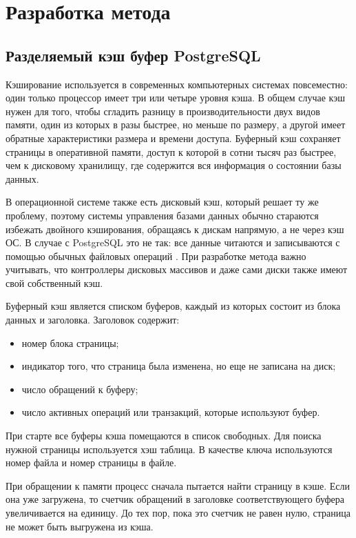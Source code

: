 \chapter{Разработка метода}

\section{Разделяемый кэш буфер PostgreSQL}

Кэширование используется в современных компьютерных системах повсеместно: один только процессор имеет три или четыре уровня кэша.
В общем случае кэш нужен для того, чтобы сгладить разницу в производительности двух видов памяти, один из которых в разы быстрее, но меньше по размеру, а другой имеет обратные характеристики размера и времени доступа.
Буферный кэш сохраняет страницы в оперативной памяти, доступ к которой в сотни тысяч раз быстрее, чем к дисковому хранилищу, где содержится вся информация о состоянии базы данных.

В операционной системе также есть дисковый кэш, который решает ту же проблему, поэтому системы управления базами данных обычно стараются избежать двойного кэширования, обращаясь к дискам напрямую, а не через кэш ОС. 
В случае с PostgreSQL это не так: все данные читаются и записываются с помощью обычных файловых операций \cite{shaik2020postgresql}.
При разработке метода важно учитывать, что контроллеры дисковых массивов и даже сами диски также имеют свой собственный кэш.

Буферный кэш является списком буферов, каждый из которых состоит из блока данных и заголовка.
Заголовок содержит:
\begin{itemize}
	\item номер блока страницы;
	\item индикатор того, что страница была изменена, но еще не записана на диск;
	\item число обращений к буферу;
	\item число активных операций или транзакций, которые используют буфер. 
\end{itemize}

При старте все буферы кэша помещаются в список свободных.
Для поиска нужной страницы используется хэш таблица.
В качестве ключа используются номер файла и номер страницы в файле.

При обращении к памяти процесс сначала пытается найти страницу в кэше.
Если она уже загружена, то счетчик обращений в заголовке соответствующего буфера увеличивается на единицу.
До тех пор, пока это счетчик не равен нулю, страница не может быть выгружена из кэша.

